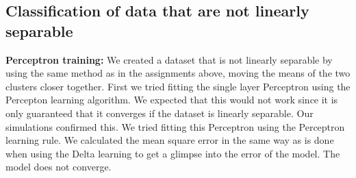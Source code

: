 \documentclass[a4paper]{article}
\begin{document}
\subsection{Classification of data that are not linearly separable}
\textbf{Perceptron training:} We created a dataset that is not linearly separable by using the same method as in the assignments above, moving the means of the two clusters closer together. First we tried fitting the single layer Perceptron using the Percepton learning algorithm. We expected that this would not work since it is only guaranteed that it converges if the dataset is linearly separable. Our simulations confirmed this. We tried fitting this Perceptron using the Perceptron learning rule. We calculated the mean square error in the same way as is done when using the Delta learning to get a glimpse into the error of the model. The model does not converge.
\end{document}
